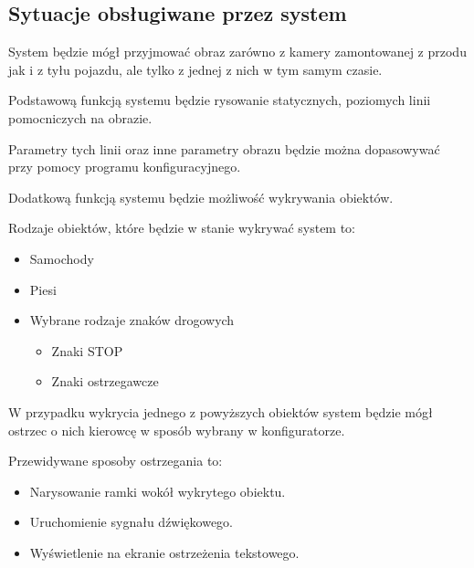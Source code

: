 \subsection{Sytuacje obsługiwane przez system}


System będzie mógł przyjmować obraz zarówno z kamery zamontowanej z przodu jak i z tyłu pojazdu, ale tylko z jednej z nich w tym samym czasie.
  
Podstawową funkcją systemu będzie rysowanie statycznych, poziomych linii pomocniczych na obrazie.
  
Parametry tych linii oraz inne parametry obrazu będzie można dopasowywać przy pomocy programu konfiguracyjnego.

Dodatkową funkcją systemu będzie możliwość wykrywania obiektów.

Rodzaje obiektów, które będzie w stanie wykrywać system to:

\begin{itemize}
	\item Samochody
	\item Piesi
	\item Wybrane rodzaje znaków drogowych
	\begin{itemize}
		\item Znaki STOP
		\item Znaki ostrzegawcze
	 \end{itemize}
 \end{itemize}
 
 W przypadku wykrycia jednego z powyższych obiektów system będzie mógł ostrzec o nich kierowcę w sposób wybrany w konfiguratorze. 
 
Przewidywane sposoby ostrzegania to:
\begin{itemize}
 	\item Narysowanie ramki wokół wykrytego obiektu.
 	\item Uruchomienie sygnału dźwiękowego.
 	\item Wyświetlenie na ekranie ostrzeżenia tekstowego.
\end{itemize}
  

  

